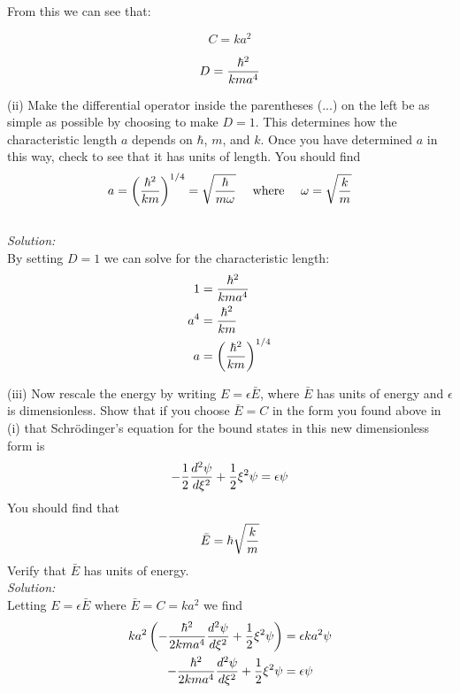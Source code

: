 \begin{enumerate}
From this we can see that:

\begin{equation}
C = k a^2
\end{equation}

\begin{equation}
D = {\hbar^2 \over k m a^4}
\end{equation}


\fi
    (ii) Make the differential operator inside the parentheses
    (...) on the left be as simple as possible by choosing to
    make $D=1$. This determines how the characteristic length $a$
    depends on $\hbar$, $m$, and $k$. Once you have determined
    $a$ in this way, check to see that it has units of length.
    You should find
    \begin{equation}
        a = \left( { \hbar^2 \over k m} \right)^{1/4}
        = \sqrt{ \hbar \over m \omega}
        ~~~~{\rm where}~~~~ \omega = \sqrt{k \over m}
    \end{equation}\\
\ifsolutions
\textit{Solution:}\\
By setting $D=1$ we can solve for the characteristic length:
\begin{align}
1 &= {\hbar^2 \over k m a^4}\\
a^4 &= {\hbar^2 \over k m }\\
a &= \left({\hbar^2 \over k m }\right)^{1/4}\\
\end{align}
\fi

    (iii) Now rescale the energy by writing $E=\epsilon \bar{E}$,
    where $\bar{E}$ has units of energy and $\epsilon$ is
    dimensionless.  Show that if you choose $\bar{E}=C$ in the
    form you found above in (i) that Schr\"{o}dinger's equation
    for the bound states in this new dimensionless form is
    \begin{equation}\label{dimensionless}
        -{1 \over 2}{d^2 \psi \over d \xi^2} +{1 \over 2} \xi^2 \psi
        = \epsilon \psi
    \end{equation}
    You should find that
\begin{equation}
    \bar{E} = \hbar \sqrt{k \over m}
\end{equation}
Verify that $\bar{E}$ has units of energy.\\
\ifsolutions
\textit{Solution:}\\
Letting $ E = \epsilon \bar{E}$ where $\bar{E} = C = k a^2$
we find
\begin{align}
    k a^2 \left(- {\hbar^2 \over 2 k m a^4} {d^2 \psi \over d\xi^2} + {1
        \over 2}  \xi^2 \psi \right) &=
    \epsilon  k a^2 \psi\\
    - {\hbar^2 \over 2 k m a^4} {d^2 \psi \over d\xi^2} + {1
        \over 2}  \xi^2 \psi &=
    \epsilon \psi\\
\end{align}


\end{enumerate}
